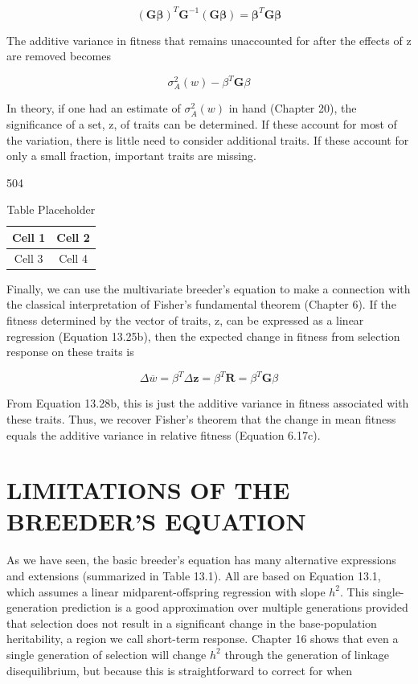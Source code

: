 \documentclass{article}
\begin{document}
\begin{equation}
\left(\mathbf{G}\boldsymbol{\beta}\right)^{T}\mathbf{G}^{-1}\left(\mathbf{G}\boldsymbol{\beta}\right)=\boldsymbol{\beta}^{T}\mathbf{G}\boldsymbol{\beta}
\tag{13.28b}
\label{eq:13_28b}
\end{equation}

The additive variance in fitness that remains unaccounted for after the effects of z are removed becomes

\begin{equation}
\sigma_{A}^{2}(w)-\beta^{T}\mathbf{G}\beta
\tag{13.28c}
\label{eq:13_28c}
\end{equation}

In theory, if one had an estimate of  $ \sigma_A^2(w) $ in hand (Chapter 20), the significance of a set, z, of traits can be determined. If these account for most of the variation, there is little need to consider additional traits. If these account for only a small fraction, important traits are missing.

504

\begin{table}[h]
\centering
\begin{tabular}{|c|c|}
\hline
Cell 1 & Cell 2 \\
\hline
Cell 3 & Cell 4 \\
\hline
\end{tabular}
\caption{Table Placeholder}
\end{table}

Finally, we can use the multivariate breeder's equation to make a connection with the classical interpretation of Fisher's fundamental theorem (Chapter 6). If the fitness determined by the vector of traits, z, can be expressed as a linear regression (Equation 13.25b), then the expected change in fitness from selection response on these traits is

\begin{equation}
\Delta\overline{w}=\beta^{T}\Delta\mathbf{z}=\beta^{T}\mathbf{R}=\beta^{T}\mathbf{G}\beta
\tag{13.29}
\label{eq:13_29}
\end{equation}

From Equation 13.28b, this is just the additive variance in fitness associated with these traits. Thus, we recover Fisher's theorem that the change in mean fitness equals the additive variance in relative fitness (Equation 6.17c).

\section{LIMITATIONS OF THE BREEDER'S EQUATION}
As we have seen, the basic breeder's equation has many alternative expressions and extensions (summarized in Table 13.1). All are based on Equation 13.1, which assumes a linear midparent-offspring regression with slope  $ h^{2} $. This single-generation prediction is a good approximation over multiple generations provided that selection does not result in a significant change in the base-population heritability, a region we call short-term response. Chapter 16 shows that even a single generation of selection will change  $ h^{2} $ through the generation of linkage disequilibrium, but because this is straightforward to correct for when
\end{document}

